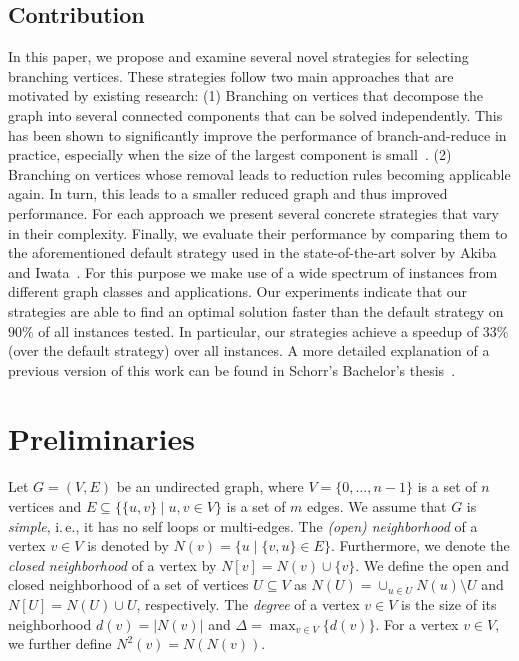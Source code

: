 \documentclass[a4paper,UKenglish,cleveref, autoref, thm-restate]{lipics-v2021}
\newcommand{\ie}{i.\,e.,\xspace}
\begin{document}
\subsection{Contribution}
In this paper, we propose and examine several novel strategies for selecting branching vertices.
These strategies follow two main approaches that are motivated by existing research: (1) Branching on vertices that decompose the graph into several connected components that can be solved independently.
This has been shown to significantly improve the performance of branch-and-reduce in practice, especially when the size of the largest component is small~\cite{alsahafy2020computing}.
(2) Branching on vertices whose removal leads to reduction rules becoming applicable again.
In turn, this leads to a smaller reduced graph and thus improved performance.
For each approach we present several concrete strategies that vary in their complexity.
Finally, we evaluate their performance by comparing them to the aforementioned default strategy used in the state-of-the-art solver by Akiba and Iwata~\cite{AkibaIwata}.
For this purpose we make use of a wide spectrum of instances from different graph classes and applications.
Our experiments indicate that our strategies are able to find an optimal
solution faster than the default strategy on $90\%$ of all instances tested.
In particular, our strategies achieve a speedup of $33\%$ (over the default strategy) over all instances.
A more detailed explanation of a previous version of this work
can be found in Schorr's Bachelor's thesis~\cite{schorr2020improved}.

\section{Preliminaries}
Let $G=(V,E)$ be an undirected graph, where $V = \{0, \ldots, n-1\}$ is a set of $n$ vertices and $E \subseteq  \{\{u,v\} \mid u,v \in V\}$ is a set of $m$ edges. 
We assume that $G$ is \emph{simple}, \ie it has no self loops or multi-edges.
The \emph{(open) neighborhood} of a vertex $v \in V$ is denoted by $N(v) = \{u \mid \{v,u\} \in E\}$.
Furthermore, we denote the \emph{closed neighborhood} of a vertex by $N[v]=N(v) \cup \{v\}$.
We define the open and closed neighborhood of a set of vertices $U \subseteq V$
as $N(U) = \cup_{u \in U} N(u) \setminus U$ and $N[U] = N(U) \cup U$, respectively.
The \emph{degree} of a vertex $v \in V$ is the size of its neighborhood $d(v) =
|N(v)|$ and $\Delta =
\max_{v \in V} \{d(v)\}$.
For a vertex $v \in V$, we further define $N^2(v) = N(N(v))$.
\end{document}
